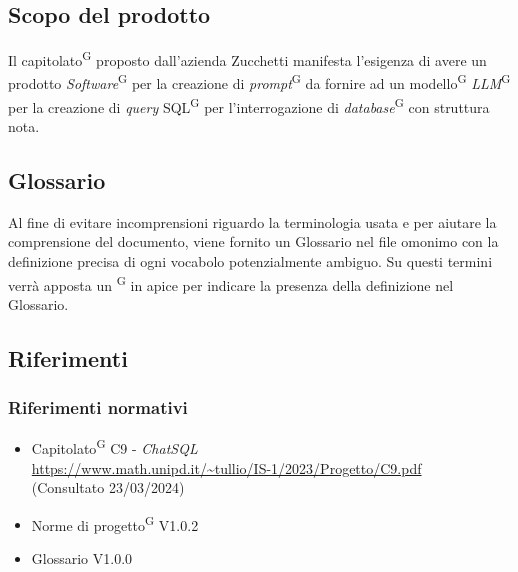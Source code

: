 \documentclass[5pt]{article}
\begin{document}
	\subsection{Scopo del prodotto}
	Il capitolato\textsuperscript{G} proposto dall'azienda Zucchetti manifesta l'esigenza di avere un prodotto \textit{Software}\textsuperscript{G} per la creazione di \textit{prompt}\textsuperscript{G} da fornire ad un modello\textsuperscript{G} \textit{LLM}\textsuperscript{G} per la creazione di \textit{query} SQL\textsuperscript{G} per l'interrogazione di \textit{database}\textsuperscript{G} con struttura nota.
	
	\subsection{Glossario}
	Al fine di evitare incomprensioni riguardo la terminologia usata e per aiutare la comprensione del documento,
	viene fornito un Glossario nel file omonimo con la definizione precisa di ogni vocabolo potenzialmente ambiguo. Su questi termini verrà apposta un \textsuperscript{G} in apice per indicare la presenza della definizione nel Glossario.
	
	\subsection{Riferimenti}
	\subsubsection{Riferimenti normativi}
	\begin{itemize}
		\item Capitolato\textsuperscript{G} C9 - \textit{ChatSQL} \\ \url{https://www.math.unipd.it/~tullio/IS-1/2023/Progetto/C9.pdf} \\ (Consultato 23/03/2024)
		\item Norme di progetto\textsuperscript{G} V1.0.2
		\item Glossario V1.0.0
	\end{itemize}
\end{document}
